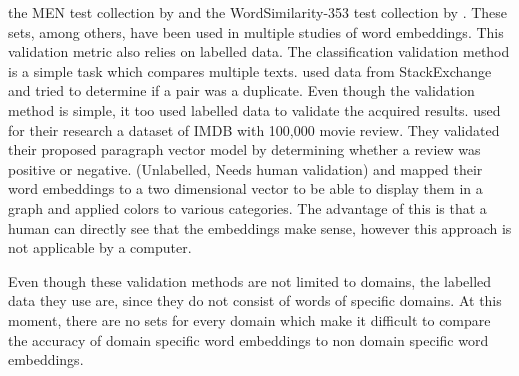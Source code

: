 \documentclass[../../Thesis.tex]{subfiles}
\begin{document}
\begin{jumpin}
the MEN test collection by \citet{EBruniMENCollection} and the WordSimilarity-353 test collection by \citet{EGabrilovichWScollection}.
These sets, among others, have been used in multiple studies of word embeddings\cite{pennington2014glove, mikolov2013efficient}. This validation metric also relies on labelled data.
The classification validation method is a simple task which compares multiple texts. \citet{lau2016empirical} used data from StackExchange and tried to determine if a pair was a duplicate. Even though the validation method is simple, it too used labelled data to validate the acquired results.
\citet{le2014distributed} used for their research a dataset of IMDB with 100,000 movie review. They validated their proposed paragraph vector model by determining whether a review was positive or negative.
(Unlabelled, Needs human validation)\citet{dai2015document} and \citet{hinton2003stochastic} mapped their word embeddings to a two dimensional vector to be able to display them in a graph and applied colors to various categories. The advantage of this is that a human can directly see that the embeddings make sense, however this approach is not applicable by a computer.\\
\end{jumpin}
Even though these validation methods are not limited to domains, the labelled data they use are, since they do not consist of words of specific domains. At this moment, there are no sets for every domain which make it difficult to compare the accuracy of domain specific word embeddings to non domain specific word embeddings.
\end{document}
